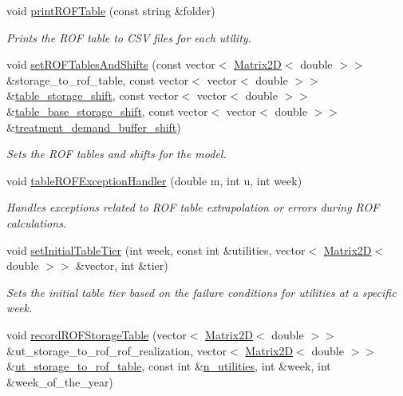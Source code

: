 \begin{DoxyCompactItemize}
void \mbox{\hyperlink{classContinuityModelROF_a1bb8362ce39e694937a787805613e106}{print\+R\+O\+F\+Table}} (const string \&folder)
\begin{DoxyCompactList}\small\item\em Prints the R\+OF table to C\+SV files for each utility. \end{DoxyCompactList}\item 
void \mbox{\hyperlink{classContinuityModelROF_a83fc5e19e0f92d12d659c3446b90fa13}{set\+R\+O\+F\+Tables\+And\+Shifts}} (const vector$<$ \mbox{\hyperlink{classMatrix2D}{Matrix2D}}$<$ double $>$$>$ \&storage\+\_\+to\+\_\+rof\+\_\+table, const vector$<$ vector$<$ double $>$$>$ \&\mbox{\hyperlink{classContinuityModelROF_a1a90c8816944aab36f395e89f7b84c06}{table\+\_\+storage\+\_\+shift}}, const vector$<$ vector$<$ double $>$$>$ \&\mbox{\hyperlink{classContinuityModelROF_a2bc5728653819a0d54a36ffbb1df44a3}{table\+\_\+base\+\_\+storage\+\_\+shift}}, const vector$<$ vector$<$ double $>$$>$ \&\mbox{\hyperlink{classContinuityModelROF_aedb1313e889617d718d2a93d719cb3f1}{treatment\+\_\+demand\+\_\+buffer\+\_\+shift}})
\begin{DoxyCompactList}\small\item\em Sets the R\+OF tables and shifts for the model. \end{DoxyCompactList}\item 
void \mbox{\hyperlink{classContinuityModelROF_a10a8a95f3177d305d3881e654f01d65d}{table\+R\+O\+F\+Exception\+Handler}} (double m, int u, int week)
\begin{DoxyCompactList}\small\item\em Handles exceptions related to R\+OF table extrapolation or errors during R\+OF calculations. \end{DoxyCompactList}\item 
void \mbox{\hyperlink{classContinuityModelROF_a0c46d5905f5d0ae2cf0abd0d4653bbc7}{set\+Initial\+Table\+Tier}} (int week, const int \&utilities, vector$<$ \mbox{\hyperlink{classMatrix2D}{Matrix2D}}$<$ double $>$$>$ \&vector, int \&tier)
\begin{DoxyCompactList}\small\item\em Sets the initial table tier based on the failure conditions for utilities at a specific week. \end{DoxyCompactList}\item 
void \mbox{\hyperlink{classContinuityModelROF_aa2348a2a5dea751462771ef538243e75}{record\+R\+O\+F\+Storage\+Table}} (vector$<$ \mbox{\hyperlink{classMatrix2D}{Matrix2D}}$<$ double $>$$>$ \&ut\+\_\+storage\+\_\+to\+\_\+rof\+\_\+rof\+\_\+realization, vector$<$ \mbox{\hyperlink{classMatrix2D}{Matrix2D}}$<$ double $>$$>$ \&\mbox{\hyperlink{classContinuityModelROF_ada25d241caf860255ad00097f5e7adb6}{ut\+\_\+storage\+\_\+to\+\_\+rof\+\_\+table}}, const int \&\mbox{\hyperlink{classContinuityModel_a6df6198ebc99a099df08f4b8ce6b52b9}{n\+\_\+utilities}}, int \&week, int \&week\+\_\+of\+\_\+the\+\_\+year)
$$
\end{DoxyCompactItemize}
